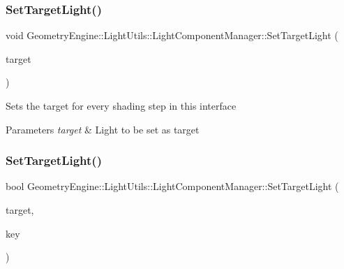 \subsubsection{\texorpdfstring{SetTargetLight()}{SetTargetLight()}\hspace{0.1cm}{\footnotesize\ttfamily [1/3]}}
{\footnotesize\ttfamily void Geometry\+Engine\+::\+Light\+Utils\+::\+Light\+Component\+Manager\+::\+Set\+Target\+Light (\begin{DoxyParamCaption}\item[{\mbox{\hyperlink{class_geometry_engine_1_1_geometry_world_item_1_1_geometry_light_1_1_light}{Geometry\+World\+Item\+::\+Geometry\+Light\+::\+Light}} $\ast$}]{target }\end{DoxyParamCaption})}

Sets the target for every shading step in this interface 
\begin{DoxyParams}{Parameters}
{\em target} & Light to be set as target \\
\hline
\end{DoxyParams}
\mbox{\label{class_geometry_engine_1_1_light_utils_1_1_light_component_manager_ad502d8781fa4d993d4db5b6954b14ff6}} 
\subsubsection{\texorpdfstring{SetTargetLight()}{SetTargetLight()}\hspace{0.1cm}{\footnotesize\ttfamily [2/3]}}
{\footnotesize\ttfamily bool Geometry\+Engine\+::\+Light\+Utils\+::\+Light\+Component\+Manager\+::\+Set\+Target\+Light (\begin{DoxyParamCaption}\item[{\mbox{\hyperlink{class_geometry_engine_1_1_geometry_world_item_1_1_geometry_light_1_1_light}{Geometry\+World\+Item\+::\+Geometry\+Light\+::\+Light}} $\ast$}]{target,  }\item[{\mbox{\hyperlink{namespace_geometry_engine_1_1_light_utils_a16eb370137c2fd151e6f8e1d07cd23e0}{Light\+Shading}}}]{key }\end{DoxyParamCaption})}

